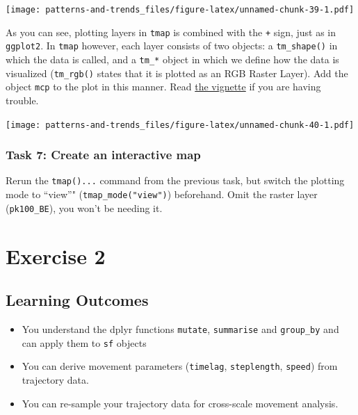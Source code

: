 \documentclass[]{book}
\providecommand{\tightlist}{%
  \setlength{\itemsep}{0pt}\setlength{\parskip}{0pt}}
\begin{document}
\texttt{[image: patterns-and-trends\_files/figure-latex/unnamed-chunk-39-1.pdf]}

As you can see, plotting layers in \texttt{tmap} is combined with the \texttt{+} sign, just as in \texttt{ggplot2}. In \texttt{tmap} however, each layer consists of two objects: a \texttt{tm\_shape()} in which the data is called, and a \texttt{tm\_*} object in which we define how the data is visualized (\texttt{tm\_rgb()} states that it is plotted as an RGB Raster Layer). Add the object \texttt{mcp} to the plot in this manner. Read \href{https://cran.r-project.org/web/packages/tmap/vignettes/tmap-getstarted.html}{the vignette} if you are having trouble.

\texttt{[image: patterns-and-trends\_files/figure-latex/unnamed-chunk-40-1.pdf]}

\hypertarget{task-7-create-an-interactive-map}{%
\subsection{Task 7: Create an interactive map}\label{task-7-create-an-interactive-map}}

Rerun the \texttt{tmap()...} command from the previous task, but switch the plotting mode to ``view''" (\texttt{tmap\_mode("view")}) beforehand. Omit the raster layer (\texttt{pk100\_BE}), you won't be needing it.

\hypertarget{exercise-2}{%
\chapter{Exercise 2}\label{exercise-2}}

\hypertarget{learning-outcomes}{%
\section{Learning Outcomes}\label{learning-outcomes}}

\begin{itemize}
\tightlist
\item
  You understand the dplyr functions \texttt{mutate}, \texttt{summarise} and \texttt{group\_by} and can apply them to \texttt{sf} objects
\item
  You can derive movement parameters (\texttt{timelag}, \texttt{steplength}, \texttt{speed}) from trajectory data.
\item
  You can re-sample your trajectory data for cross-scale movement analysis.
\end{itemize}
\end{document}

